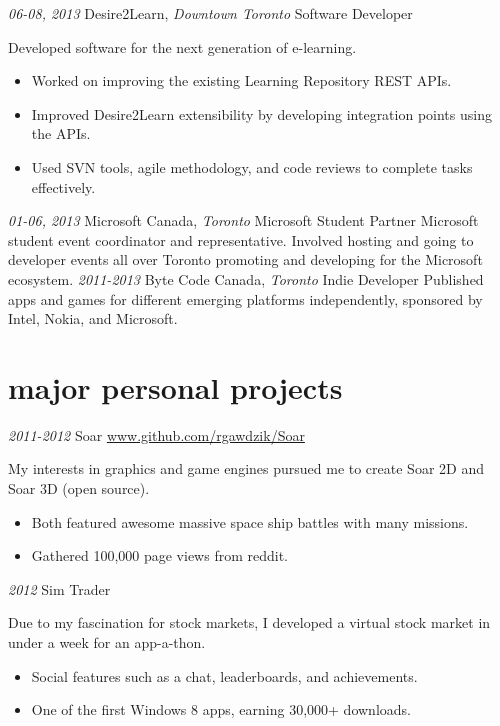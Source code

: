 \documentclass[]{friggeri-cv}
\begin{document}
\begin{entrylist}
  \entry
    {\emph{06-08, 2013}}
    {Desire2Learn, {\normalfont \emph{Downtown Toronto}}}
    {Software Developer}
    {Developed software for the next generation of e-learning.
         \begin{itemize}
	\item Worked on improving the existing Learning Repository REST APIs.
	\item Improved Desire2Learn extensibility by developing integration points using the APIs.
	\item Used SVN tools, agile methodology, and code reviews to complete tasks effectively.
	\end{itemize}}
  \entry
    {\emph{01-06, 2013}}
    {Microsoft Canada, {\normalfont \emph{Toronto}}}
    {Microsoft Student Partner}
    {Microsoft student event coordinator and representative. Involved hosting and going to developer events all over Toronto promoting and developing for the Microsoft ecosystem.}
  \entry
    {\emph{2011-2013}}
    {Byte Code Canada, {\normalfont \emph{Toronto}}}
    {Indie Developer}
    {Published apps and games for different emerging platforms independently, sponsored by Intel, Nokia, and Microsoft.}
\end{entrylist}

\section{major personal projects}

\begin{entrylist}
\entry
    {\emph{2011-2012}}
    {Soar}
    {\href{https://github.com/rgawdzik/Soar}{www.github.com/rgawdzik/Soar}}
    {My interests in graphics and game engines pursued me to create Soar 2D and Soar 3D (open source).
    \begin{itemize}
      \item Both featured awesome massive space ship battles with many missions.
      \item Gathered 100,000 page views from reddit.
      \end{itemize}}
  \entry
    {\emph{2012}}
    {Sim Trader}
    {}
    {Due to my fascination for stock markets, I developed a virtual stock market in under a week for an app-a-thon.
    \begin{itemize}
    \item Social features such as a chat, leaderboards, and achievements. 
    \item One of the first Windows 8 apps, earning 30,000+ downloads.
    \end{itemize}}
\end{entrylist}
\end{document}
